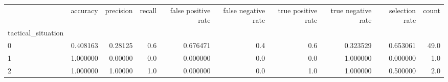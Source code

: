 \begin{tabular}{lrrrrrrrrr}
\toprule
{} &  accuracy &  precision &  recall &  false positive rate &  false negative rate &  true positive rate &  true negative rate &  selection rate &  count \\
tactical\_situation &           &            &         &                      &                      &                     &                     &                 &        \\
\midrule
0                  &  0.408163 &    0.28125 &     0.6 &             0.676471 &                  0.4 &                 0.6 &            0.323529 &        0.653061 &   49.0 \\
1                  &  1.000000 &    0.00000 &     0.0 &             0.000000 &                  0.0 &                 0.0 &            1.000000 &        0.000000 &    1.0 \\
2                  &  1.000000 &    1.00000 &     1.0 &             0.000000 &                  0.0 &                 1.0 &            1.000000 &        0.500000 &    2.0 \\
\bottomrule
\end{tabular}
